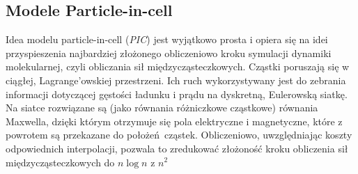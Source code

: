     \subsection{Modele Particle-in-cell}

    Idea modelu particle-in-cell (\emph{PIC}) jest wyjątkowo prosta i opiera
    się na idei przyspieszenia najbardziej złożonego obliczeniowo kroku
    symulacji dynamiki molekularnej, czyli obliczania sił międzycząsteczkowych.
    Cząstki poruszają się w ciągłej, Lagrange'owskiej przestrzeni.  Ich ruch
    wykorzystywany jest do zebrania informacji dotyczącej gęstości ładunku i
    prądu na dyskretną, Eulerowską siatkę. Na siatce rozwiązane są (jako
    równania różniczkowe cząstkowe) równania Maxwella, dzięki którym otrzymuje
    się pola elektryczne i magnetyczne, które z powrotem są przekazane do
    położeń cząstek.  Obliczeniowo, uwzględniając koszty odpowiednich
    interpolacji, pozwala to zredukować złożoność kroku obliczenia sił
    międzycząsteczkowych do $n \log{n}$ z $n^2$ 

